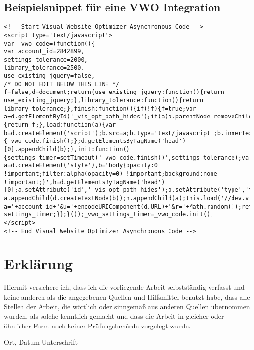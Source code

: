 \section{Beispielsnippet für eine VWO Integration}\label{vwo_integration}

\hspace{1cm}
\begin{minipage}{\linewidth}
\begin{lstlisting}[caption=Beispielsnippet für eine VWO Integration, label=vwo_snippet]
<!-- Start Visual Website Optimizer Asynchronous Code -->
<script type='text/javascript'>
var _vwo_code=(function(){
var account_id=2842899,
settings_tolerance=2000,
library_tolerance=2500,
use_existing_jquery=false,
/* DO NOT EDIT BELOW THIS LINE */
f=false,d=document;return{use_existing_jquery:function(){return use_existing_jquery;},library_tolerance:function(){return library_tolerance;},finish:function(){if(!f){f=true;var a=d.getElementById('_vis_opt_path_hides');if(a)a.parentNode.removeChild(a);}},finished:function(){return f;},load:function(a){var b=d.createElement('script');b.src=a;b.type='text/javascript';b.innerText;b.onerror=function(){_vwo_code.finish();};d.getElementsByTagName('head')[0].appendChild(b);},init:function(){settings_timer=setTimeout('_vwo_code.finish()',settings_tolerance);var a=d.createElement('style'),b='body{opacity:0 !important;filter:alpha(opacity=0) !important;background:none !important;}',h=d.getElementsByTagName('head')[0];a.setAttribute('id','_vis_opt_path_hides');a.setAttribute('type','text/css');if(a.styleSheet)a.styleSheet.cssText=b;else a.appendChild(d.createTextNode(b));h.appendChild(a);this.load('//dev.visualwebsiteoptimizer.com/j.php?a='+account_id+'&u='+encodeURIComponent(d.URL)+'&r='+Math.random());return settings_timer;}};}());_vwo_settings_timer=_vwo_code.init();
</script>
<!-- End Visual Website Optimizer Asynchronous Code -->
\end{lstlisting}
\end{minipage}
\hspace{1cm}









\chapter*{Erklärung}

Hiermit versichere ich, dass ich die vorliegende Arbeit selbstständig verfasst und keine anderen als die angegebenen Quellen und Hilfsmittel benutzt habe, dass alle Stellen der Arbeit, die wörtlich oder sinngemäß aus anderen Quellen übernommen wurden, als solche kenntlich gemacht und dass die Arbeit in gleicher oder ähnlicher Form noch keiner Prüfungsbehörde vorgelegt wurde.

\vspace{3cm}
Ort, Datum \hspace{5cm} Unterschrift\\


